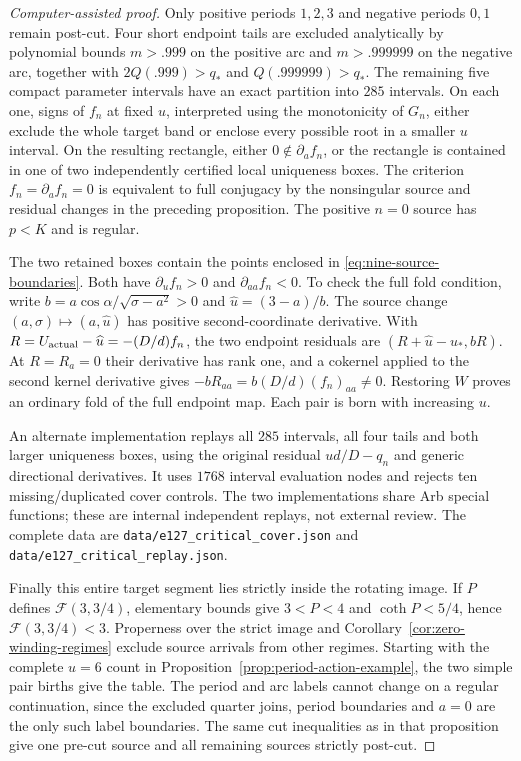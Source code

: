 \documentclass[11pt,a4paper]{article}
\theoremstyle{remark}\newtheorem{remark}[theorem]{Remark}
\begin{document}
\begin{proof}[Computer-assisted proof]
Only positive periods $1,2,3$ and negative periods $0,1$ remain post-cut.
Four short endpoint tails are excluded analytically by polynomial bounds
$m>.999$ on the positive arc and $m>.999999$ on the negative arc,
together with $2Q(.999)>q_*$ and $Q(.999999)>q_*$.
The remaining five compact parameter intervals have an exact partition
into $285$ intervals. On each one, signs of $f_n$ at fixed $u$, interpreted
using the monotonicity of $G_n$, either exclude the whole target band or
enclose every possible root in a smaller $u$ interval. On the resulting
rectangle, either $0\notin\partial_af_n$, or the rectangle is contained
in one of two independently certified local uniqueness boxes.
The criterion $f_n=\partial_af_n=0$ is equivalent to full conjugacy by
the nonsingular source and residual changes in the preceding proposition.
The positive $n=0$ source has $p<K$ and is regular.

The two retained boxes contain the points enclosed in
\eqref{eq:nine-source-boundaries}. Both have
$\partial_uf_n>0$ and $\partial_{aa}f_n<0$. To check the full fold
condition, write $b=a\cos\alpha/\sqrt{\sigma-a^2}>0$ and
$\widehat u=(3-a)/b$. The source change $(a,\sigma)\mapsto(a,\widehat u)$
has positive second-coordinate derivative. With
$R=U_{\rm actual}-\widehat u=-(D/d)f_n$, the two endpoint residuals are
$(R+\widehat u-u_*,bR)$. At $R=R_a=0$ their derivative has rank one,
and a cokernel applied to the second kernel derivative gives
$-bR_{aa}=b(D/d)(f_n)_{aa}\ne0$. Restoring $W$ proves an ordinary fold
of the full endpoint map. Each pair is born with increasing $u$.

An alternate implementation replays all $285$ intervals, all four tails
and both larger uniqueness boxes, using the original residual
$ud/D-q_n$ and generic directional derivatives. It uses $1768$ interval
evaluation nodes and rejects ten missing/duplicated cover controls.
The two implementations share Arb special functions; these are internal
independent replays, not external review. The complete data are
\nolinkurl{data/e127_critical_cover.json} and
\nolinkurl{data/e127_critical_replay.json}.

Finally this entire target segment lies strictly inside the rotating image.
If $P$ defines $\mathcal F(3,3/4)$, elementary bounds give
$3<P<4$ and $\coth P<5/4$, hence $\mathcal F(3,3/4)<3$.
Properness over the strict image and Corollary~\ref{cor:zero-winding-regimes}
exclude source arrivals from other regimes. Starting with the complete
$u=6$ count in Proposition~\ref{prop:period-action-example}, the two simple
pair births give the table. The period and arc labels cannot change on a
regular continuation, since the excluded quarter joins, period boundaries
and $a=0$ are the only such label boundaries. The same cut inequalities
as in that proposition give one pre-cut source and all remaining sources
strictly post-cut.
\end{proof}
\end{document}
